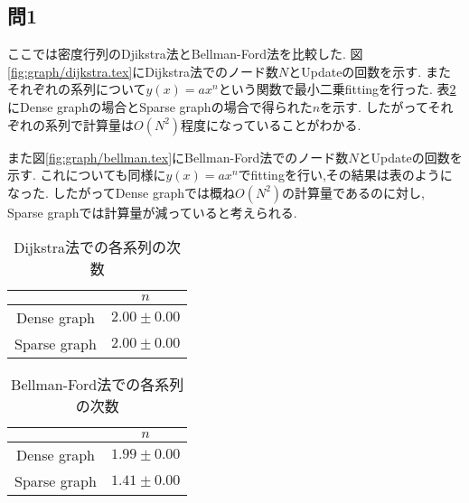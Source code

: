 \subsection*{問1}
ここでは密度行列のDjikstra法とBellman-Ford法を比較した.
図\ref{fig:graph/dijkstra.tex}にDijkstra法でのノード数$N$とUpdateの回数を示す.
またそれぞれの系列について$y(x)=ax^n$という関数で最小二乗fittingを行った.
表\ref{tab:dijkstra_n}にDense graphの場合とSparse graphの場合で得られた$n$を示す.
したがってそれぞれの系列で計算量は$O(N^2)$程度になっていることがわかる.

また図\ref{fig:graph/bellman.tex}にBellman-Ford法でのノード数$N$とUpdateの回数を示す.
これについても同様に$y(x)=ax^n$でfittingを行い,その結果は表のようになった.
したがってDense graphでは概ね$O(N^2)$の計算量であるのに対し, Sparse graphでは計算量が減っていると考えられる.
\begin{table}[h]
\caption{Dijkstra法での各系列の次数}
\label{tab:dijkstra_n}
\centering
\begin{tabular}{c|c}
\hline
&$n$\\
\hline \hline
Dense graph&$2.00\pm0.00$\\
Sparse graph&$2.00\pm0.00$\\
\hline
\end{tabular}
\end{table}
\begin{table}[h]
  \caption{Bellman-Ford法での各系列の次数}
  \label{tab:dijkstra_n}
  \centering
  \begin{tabular}{c|c}
  \hline
  &$n$\\
  \hline \hline
  Dense graph&$1.99\pm0.00$\\
  Sparse graph&$1.41\pm0.00$\\
  \hline
  \end{tabular}
  \end{table}

